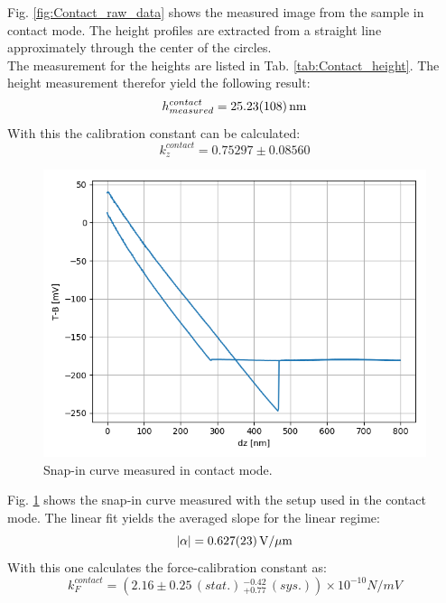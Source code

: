 \documentclass[%
 reprint,
amsmath,amssymb,
pra,
]{revtex4-1}
\begin{document}
Fig. \ref{fig:Contact_raw_data} shows the measured image from the sample in contact mode. The height profiles are extracted from a straight line approximately through the center of the circles. \\
The measurement for the heights are listed in Tab. \ref{tab:Contact_height}. The height measurement therefor yield the following result:
\begin{equation*}
h_{measured}^{contact} = \SI{25.23 \pm 1.08}{nm}
\end{equation*}
With this the calibration constant can be calculated:
\begin{equation*}
k_z^{contact} = 0.75297 \pm 0.08560
\end{equation*}

\begin{figure}
\centering
\includegraphics[scale=0.5]{Bilder/Contact_Mode/Snap_in_curve.PNG}
\caption{Snap-in curve measured in contact mode.}
\label{fig:Contact_snap_in}
\end{figure}

Fig. \ref{fig:Contact_snap_in} shows the snap-in curve measured with the setup used in the contact mode. The linear fit yields the averaged slope for the linear regime:
\begin{equation*}
|\alpha| = \SI{0.627 \pm 0.023}{V \per \mu m}
\end{equation*}
With this one calculates the force-calibration constant as:
\begin{equation*}
k_F^{contact} = (2.16 \pm 0.25 \, (stat.) \, _{+ 0.77} ^{- 0.42} \, (sys.)) \times 10^{-10} \si{N \per mV}
\end{equation*}
\end{document}
